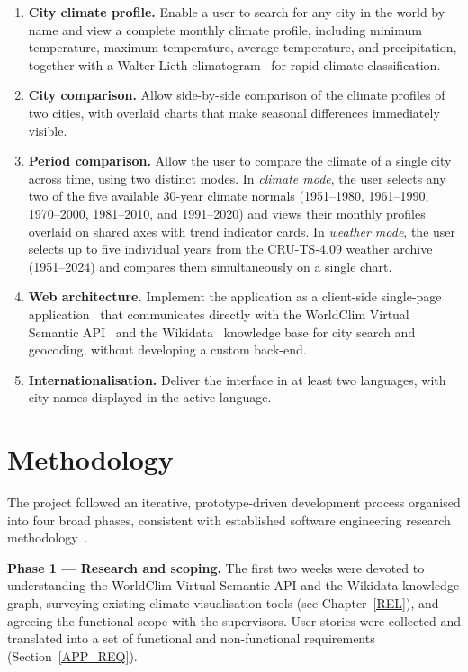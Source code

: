 \begin{enumerate}
  \item \textbf{City climate profile.} Enable a user to search for any city in
    the world by name and view a complete monthly climate profile, including
    minimum temperature, maximum temperature, average temperature, and
    precipitation, together with a Walter-Lieth climatogram~\cite{walter1960} 
    for rapid climate classification.

  \item \textbf{City comparison.} Allow side-by-side comparison of the climate
    profiles of two cities, with overlaid charts that make seasonal differences
    immediately visible.

  \item \textbf{Period comparison.} Allow the user to compare the climate of a
    single city across time, using two distinct modes. In \emph{climate mode},
    the user selects any two of the five available 30-year climate normals
    (1951--1980, 1961--1990, 1970--2000, 1981--2010, and 1991--2020) and views
    their monthly profiles overlaid on shared axes with trend indicator cards.
    In \emph{weather mode}, the user selects up to five individual years from
    the CRU-TS-4.09 weather archive (1951--2024) and compares them
    simultaneously on a single chart.

  \item \textbf{Web architecture.} Implement the application as a client-side
    single-page application~\cite{react} that communicates directly with the
    WorldClim Virtual Semantic API~\cite{scrapi} and the Wikidata~\cite{wikidata}
    knowledge base for city search and geocoding, without developing a custom
    back-end.

  \item \textbf{Internationalisation.} Deliver the interface in at least two
    languages, with city names displayed in the active language.
\end{enumerate}

\section{Methodology}\label{INTRO_MET}

The project followed an iterative, prototype-driven development process
organised into four broad phases, consistent with established software
engineering research methodology~\cite{adrion1993}.

\textbf{Phase 1 --- Research and scoping.} The first two weeks were devoted to
understanding the WorldClim Virtual Semantic API and the Wikidata knowledge
graph, surveying existing climate visualisation tools (see
Chapter~\ref{REL}), and agreeing the functional scope with the supervisors.
User stories were collected and translated into a set of functional and
non-functional requirements (Section~\ref{APP_REQ}).

